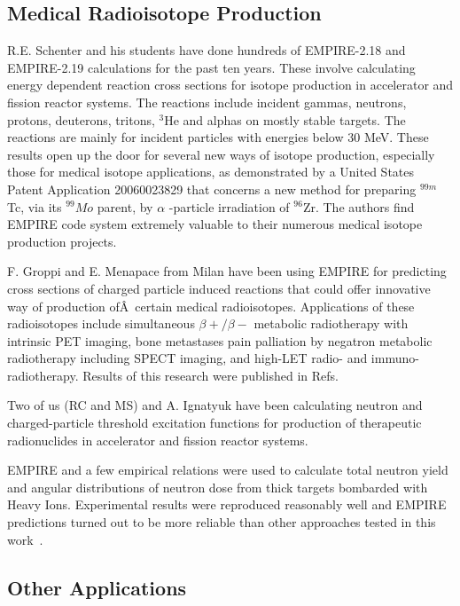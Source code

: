 \subsection{Medical Radioisotope Production}

R.E. Schenter and his students have done hundreds of EMPIRE-2.18 and
EMPIRE-2.19 calculations for the past ten years. These involve calculating
energy dependent reaction cross sections for isotope production in
accelerator and fission reactor systems. The reactions include incident
gammas, neutrons, protons, deuterons, tritons, $^{3}$He and alphas on mostly
stable targets. The reactions are mainly for incident particles with
energies below 30 MeV. These results open up the door for several new ways
of isotope production, especially those for medical isotope applications, as
demonstrated by a United States Patent Application 20060023829 that concerns
a new method for preparing $^{99m}$Tc, via its $^{99}Mo$ parent, by $\alpha $%
-particle irradiation of $^{96}$Zr. The authors find EMPIRE code system
extremely valuable to their numerous medical isotope production projects.

F. Groppi and E. Menapace from Milan have been using EMPIRE for predicting
cross sections of charged particle induced reactions that could offer
innovative way of production of\^{A}~certain medical radioisotopes.
Applications of these radioisotopes include simultaneous $\beta +/\beta -$
metabolic radiotherapy with intrinsic PET imaging, bone metastases pain
palliation by negatron metabolic radiotherapy including SPECT imaging, and
high-LET radio- and immuno-radiotherapy. Results of this research were
published in Refs.~\cite{Menapace:04, Menapace:05, Groppi:05, Groppi:05a,
Groppi:06, Alfassi:06, Persico:06}

Two of us (RC and MS) and A. Ignatyuk have been calculating neutron and
charged-particle threshold excitation functions for production of
therapeutic radionuclides in accelerator and fission reactor systems.

EMPIRE and a few empirical relations were used to calculate total neutron
yield and angular distributions of neutron dose from thick targets bombarded
with Heavy Ions. Experimental results were reproduced reasonably well and
EMPIRE predictions turned out to be more reliable than other approaches
tested in this work~\cite{Nandy:07}.

\subsection{Other Applications}

